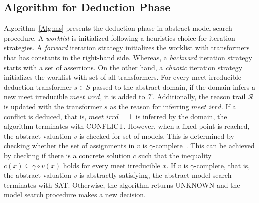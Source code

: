 \subsection{Algorithm for Deduction Phase}
%
Algorithm~\ref{Alg:ms} presents the deduction phase in abstract model search procedure.
A {\em worklist} is initialized following a heuristics choice for iteration 
strategies. A {\em forward} iteration strategy initializes the worklist with 
transformers that has constants in the right-hand side. Whereas, a {\em backward} 
iteration strategy starts with a set of assertions. On the other hand, a 
{\em chaotic} iteration strategy initializes the worklist with set of all 
transformers.  For every meet irreducible deduction transformer $s \in S$ 
passed to the abstract domain, if the domain infers a new meet irreducible 
$\mathit{meet\_irrd}$, it is added to $\mathcal{T}$.  Additionally, the reason 
trail $\mathcal{R}$ is updated with the transformer $s$ as the reason for inferring
$\mathit{meet\_irrd}$. If a conflict is deduced, that is, $\mathit{meet\_irrd} = \bot$ 
is inferred by the domain, the algorithm terminates with CONFLICT.  However,
when a fixed-point is reached, the abstract valuation $v$ is checked for set of
models.  This is determined by checking whether the set of assignments in $v$ is 
$\gamma$-complete~\cite{gamma}.  This can be achieved by checking if there is a 
concrete solution $c$ such that the inequality $c(x) \subseteq \gamma \circ
v(x)$ holds for every meet irreducible $x$.  If $v$ is $\gamma$-complete, that is, the 
abstract valuation $v$ is abstractly satisfying, the abstract model 
search terminates with SAT.  Otherwise, the algorithm returns UNKNOWN and the 
model search procedure makes a new decision.    



